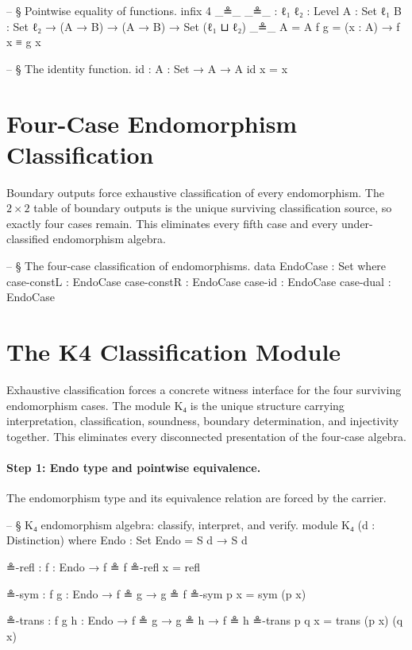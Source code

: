 \documentclass[11pt,a4paper]{book}
\def\texttt#1{#1}%
\def\texorpdfstring#1#2{#2}%
\begin{document}
\begin{code}
-- § Pointwise equality of functions.
infix 4 _≗_
_≗_ : {ℓ₁ ℓ₂ : Level} {A : Set ℓ₁} {B : Set ℓ₂} → (A → B) → (A → B) → Set (ℓ₁ ⊔ ℓ₂)
_≗_ {A = A} f g = (x : A) → f x ≡ g x

-- § The identity function.
id : {A : Set} → A → A
id x = x
\end{code}

\section{Four-Case Endomorphism Classification}

Boundary outputs force exhaustive classification of every endomorphism.
The $2 \times 2$ table of boundary outputs is the unique surviving classification source, so exactly four cases remain.
This eliminates every fifth case and every under-classified endomorphism algebra.

\begin{code}
-- § The four-case classification of endomorphisms.
data EndoCase : Set where
  case-constL : EndoCase
  case-constR : EndoCase
  case-id     : EndoCase
  case-dual   : EndoCase
\end{code}

\section{The \texorpdfstring{$K_4$}{K4} Classification Module}

Exhaustive classification forces a concrete witness interface for the four surviving endomorphism cases.
The module \texttt{K₄} is the unique structure carrying interpretation, classification, soundness, boundary determination, and injectivity together.
This eliminates every disconnected presentation of the four-case algebra.

\paragraph{Step 1: Endo type and pointwise equivalence.}
The endomorphism type and its equivalence relation are forced by the carrier.

\begin{code}
-- § K₄ endomorphism algebra: classify, interpret, and verify.
module K₄ (d : Distinction) where
  Endo : Set
  Endo = S d → S d

  ≗-refl : {f : Endo} → f ≗ f
  ≗-refl x = refl

  ≗-sym : {f g : Endo} → f ≗ g → g ≗ f
  ≗-sym p x = sym (p x)

  ≗-trans : {f g h : Endo} → f ≗ g → g ≗ h → f ≗ h
  ≗-trans p q x = trans (p x) (q x)
\end{code}
\end{document}
